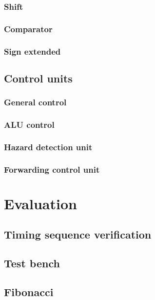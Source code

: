 \documentclass[11pt, a4paper, twoside]{article}
\begin{document}
\subsubsection{Shift}
\subsubsection{Comparator}
\subsubsection{Sign extended}
\subsection{Control units}
\subsubsection{General control}
\subsubsection{ALU control}
\subsubsection{Hazard detection unit}
\subsubsection{Forwarding control unit}

\section{Evaluation}
\subsection{Timing sequence verification}
\subsection{Test bench}
\subsection{Fibonacci}
	
\end{document}
